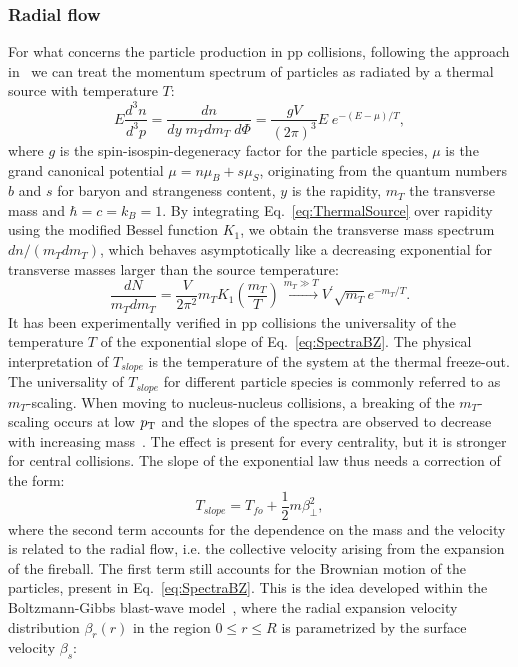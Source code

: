 \subsubsection{Radial flow}
For what concerns the particle production in pp collisions, following the approach in~\cite{Schnedermann:1993ws} we can treat the momentum spectrum of particles as radiated by a thermal source with temperature $T$:
\begin{equation}
\label{eq:ThermalSource}
E\frac{d^{3}n}{d^3p} = \frac{dn}{dy \; m_{T} dm_T\;d\Phi} = \frac{gV}{(2\pi)^3}E\;e^{-(E-\mu)/T},
\end{equation}
  where $g$ is the spin-isospin-degeneracy factor for the particle species, $\mu$ is the grand canonical potential $\mu = n\mu_{B}+ s\mu_S$, originating from the quantum numbers $b$ and $s$ for baryon and strangeness content, $y$ is the rapidity, $m_{T}$ the transverse mass and $\hbar = c = k_B = 1$. By integrating Eq.~\ref{eq:ThermalSource} over rapidity using the modified Bessel function $K_1$, we obtain the transverse mass spectrum $dn/(m_Tdm_T)$, which behaves asymptotically like a decreasing exponential for transverse masses larger than the source temperature: 
\begin{equation}
\label{eq:SpectraBZ}
\frac{dN}{m_T dm_T} = \frac{V}{2\pi^2} m_T K_1 (\frac{m_T}{T}) \xrightarrow{m_T \gg T} V^\prime \sqrt{m_T} e^{-m_T/T}.
\end{equation}
It has been experimentally verified in pp collisions the universality of the temperature $T$ of the exponential slope of Eq.~\ref{eq:SpectraBZ}. The physical interpretation of $T_{slope}$ is the temperature of the system at the thermal freeze-out. The universality of $T_{slope}$ for different particle species is commonly referred to as $m_{T}$-scaling. When moving to nucleus-nucleus collisions, a breaking of the $m_T$-scaling occurs at low $p_{\rm T}$ and the slopes of the spectra are observed to decrease with increasing mass~\cite{Appelshauser:1998yb,Arnaldi:2007ru}. The effect is present for every centrality, but it is stronger for central collisions. The slope of the exponential law thus needs a correction of the form:
\begin{equation}
\label{eq:Tslope}
T_{slope} = T_{fo} + \frac{1}{2}m \beta_{\perp}^{2},
\end{equation}
where the second term accounts for the dependence on the mass and the velocity is related to the radial flow, i.e. the collective velocity arising from the expansion of the fireball. The first term still accounts for the Brownian motion of the particles, present in Eq.~\ref{eq:SpectraBZ}. This is the idea developed within the Boltzmann-Gibbs blast-wave model~\cite{Schnedermann:1993ws}, where the radial expansion velocity distribution $\beta_r(r)$ in the region \mbox{$0 \leq r \leq R$} is parametrized by the surface velocity $\beta_s$:
